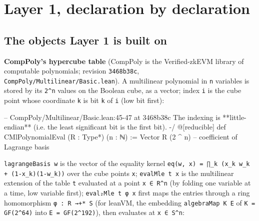 \section{Layer 1, declaration by declaration}\label{sec:gen-cat-layer1}

\subsection{The objects Layer 1 is built on}

\textbf{CompPoly's hypercube table} (CompPoly is the Verified-zkEVM library of computable polynomials; revision \texttt{3468b38c}, \texttt{C\allowbreak{}o\allowbreak{}m\allowbreak{}p\allowbreak{}P\allowbreak{}o\allowbreak{}l\allowbreak{}y\allowbreak{}/\allowbreak{}M\allowbreak{}u\allowbreak{}l\allowbreak{}t\allowbreak{}i\allowbreak{}l\allowbreak{}i\allowbreak{}n\allowbreak{}e\allowbreak{}a\allowbreak{}r\allowbreak{}/\allowbreak{}B\allowbreak{}a\allowbreak{}s\allowbreak{}i\allowbreak{}c\allowbreak{}.\allowbreak{}l\allowbreak{}e\allowbreak{}a\allowbreak{}n}). A multilinear polynomial in \texttt{n} variables is stored by its \texttt{2\textasciicircum{}n} values on the Boolean cube, as a vector; index \texttt{i} is the cube point whose coordinate \texttt{k} is bit \texttt{k} of \texttt{i} (low bit first):

\begin{leancode}
-- CompPoly/Multilinear/Basic.lean:45-47 at 3468b38c
  The indexing is **little-endian** (i.e. the least significant bit is the first bit). -/
@[reducible]
def CMlPolynomialEval (R : Type*) (n : ℕ) := Vector R (2 ^ n) -- coefficient of Lagrange basis
\end{leancode}

\texttt{lagrangeBasis w} is the vector of the equality kernel \texttt{e\allowbreak{}q\allowbreak{}(\allowbreak{}w\allowbreak{},\allowbreak{} x\allowbreak{})\allowbreak{} =\allowbreak{} ∏\allowbreak{}\_\allowbreak{}k\allowbreak{} (\allowbreak{}x\allowbreak{}\_\allowbreak{}k\allowbreak{} w\allowbreak{}\_\allowbreak{}k\allowbreak{} +\allowbreak{} (\allowbreak{}1\allowbreak{}-{}\allowbreak{}x\allowbreak{}\_\allowbreak{}k\allowbreak{})\allowbreak{}(\allowbreak{}1\allowbreak{}-{}\allowbreak{}w\allowbreak{}\_\allowbreak{}k\allowbreak{})\allowbreak{})} over the cube points \texttt{x}; \texttt{evalMle t x} is the multilinear extension of the table \texttt{t} evaluated at a point \texttt{x ∈ R\textasciicircum{}n} (by folding one variable at a time, low variable first); \texttt{eval₂Mle t φ x} first maps the entries through a ring homomorphism \texttt{φ : R →+* S} (for leanVM, the embedding \texttt{algebraMap K E} of \texttt{K = GF(\allowbreak{}2\textasciicircum{}64)} into \texttt{E = GF(\allowbreak{}2\textasciicircum{}192)}), then evaluates at \texttt{x ∈ S\textasciicircum{}n}:

